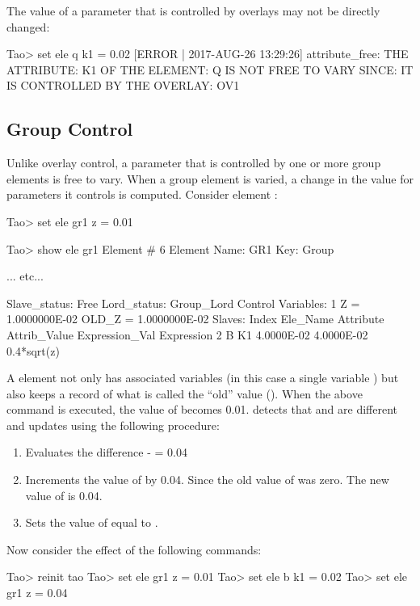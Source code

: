 \documentclass{hitec}
\begin{document}
The value of a parameter that is controlled by overlays may not be directly changed:
\begin{code}
Tao> set ele q k1 = 0.02
[ERROR | 2017-AUG-26 13:29:26] attribute_free:
    THE ATTRIBUTE: K1
    OF THE ELEMENT: Q
    IS NOT FREE TO VARY SINCE:
    IT IS CONTROLLED BY THE OVERLAY: OV1
\end{code}

\subsection{Group Control}

Unlike overlay control, a parameter that is controlled by one or more group elements is free to vary.
When a group element is varied, a change in the value for parameters it controls is computed.
Consider  element :
\begin{code} 
Tao> set ele gr1 z = 0.01

Tao> show ele gr1
 Element #                6
 Element Name: GR1
 Key: Group

... etc...    

Slave_status: Free
Lord_status:  Group_Lord
Control Variables:
    1   Z  =  1.0000000E-02           OLD_Z  =  1.0000000E-02
Slaves:
   Index   Ele_Name  Attribute   Attrib_Value  Expression_Val    Expression
       2   B         K1            4.0000E-02      4.0000E-02    0.4*sqrt(z)
\end{code}
A  element not only has associated variables (in this case a single variable ) but
\bmad also keeps a record of what is called the ``old'' value (). When the above  command is executed, the value of  becomes 0.01. \bmad detects that 
and  are different and updates  using the following procedure:
\vspace{-10 pt}
\begin{enumerate}
\item
Evaluates the difference  -  = 0.04
\item
Increments the value of  by 0.04.
Since the old value of  was zero. The new value of  is 0.04.
\item
Sets the value of  equal to .
\end{enumerate}

Now consider the effect of the following commands:
\begin{code}
Tao> reinit tao
Tao> set ele gr1 z = 0.01
Tao> set ele b k1 = 0.02
Tao> set ele gr1 z = 0.04
\end{code}
\end{document}
